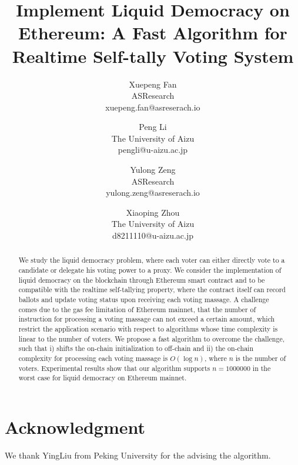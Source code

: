 \documentclass[12pt]{article}
\begin{document}
	\pagestyle{empty}		
	
	\title{Implement Liquid Democracy on Ethereum: A Fast Algorithm for Realtime Self-tally Voting System}
	{\author{Xuepeng Fan\\ASResearch\\xuepeng.fan@asreserach.io}
	\author{Peng Li\\The University of Aizu\\pengli@u-aizu.ac.jp}
	\author{Yulong Zeng\\ASResearch\\yulong.zeng@asreserach.io}
	\author{Xiaoping Zhou\\The University of Aizu\\d8211110@u-aizu.ac.jp}}
\maketitle
\begin{abstract}
	We study the liquid democracy problem, where each voter can either directly vote to a candidate or delegate his voting power to a proxy. We consider the implementation of liquid democracy on the blockchain through Ethereum smart contract and to be compatible with the realtime self-tallying property, where the contract itself can record  ballots and update voting status upon receiving each voting massage.  A challenge comes due to the gas fee limitation of Ethereum mainnet, that the number of instruction for processing a voting massage can not exceed a certain amount, which restrict the application scenario with respect to algorithms whose time complexity is linear to the number of voters. We propose a fast algorithm to overcome the challenge, such that i) shifts the on-chain initialization to off-chain and ii) the on-chain complexity for processing each voting massage is $O(\log n)$, where $n$ is the number of voters. Experimental results show that our algorithm supports $n=1000000$ in the worst case for liquid democracy on Ethereum mainnet. 
\end{abstract}







\section*{Acknowledgment}
We thank YingLiu from Peking University for the advising the algorithm.



\end{document}
